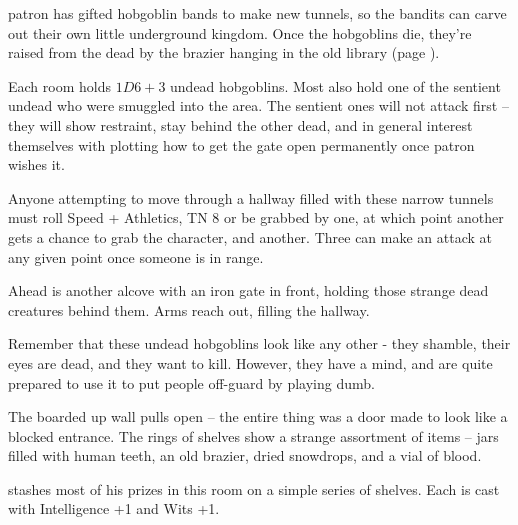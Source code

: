 \begin{multicols}{2}

\Gls{patron} has gifted hobgoblin bands to make new tunnels, so the bandits can carve out their own little underground kingdom.  Once the hobgoblins die, they're raised from the dead by the brazier hanging in the old library (page \pageref{oldlibrary}).

Each room holds $1D6+3$ undead hobgoblins.  Most also hold one of the sentient undead who were smuggled into the area.  The sentient ones will not attack first -- they will show restraint, stay behind the other dead, and in general interest themselves with plotting how to get the gate open permanently once \gls{patron} wishes it.

\huntingdog


Anyone attempting to move through a hallway filled with these narrow tunnels must roll Speed + Athletics, TN 8 or be grabbed by one, at which point another gets a chance to grab the character, and another.  Three can make an attack at any given point once someone is in range.

\begin{boxtext}

	Ahead is another alcove with an iron gate in front, holding those strange dead creatures behind them.  Arms reach out, filling the hallway.

\end{boxtext}

\undeadhobgoblin


Remember that these undead hobgoblins look like any other - they shamble, their eyes are dead, and they want to kill.
However, they have a mind, and are quite prepared to use it to put people off-guard by playing dumb.

\sentientundeadhobgoblin


\begin{boxtext}

	The boarded up wall pulls open -- the entire thing was a door made to look like a blocked entrance.  The rings of shelves show a strange assortment of items -- jars filled with human teeth, an old brazier, dried snowdrops, and a vial of blood.

\end{boxtext}

 stashes most of his prizes in this room on a simple series of shelves.  Each is cast with Intelligence +1 and Wits +1.


\end{multicols}
